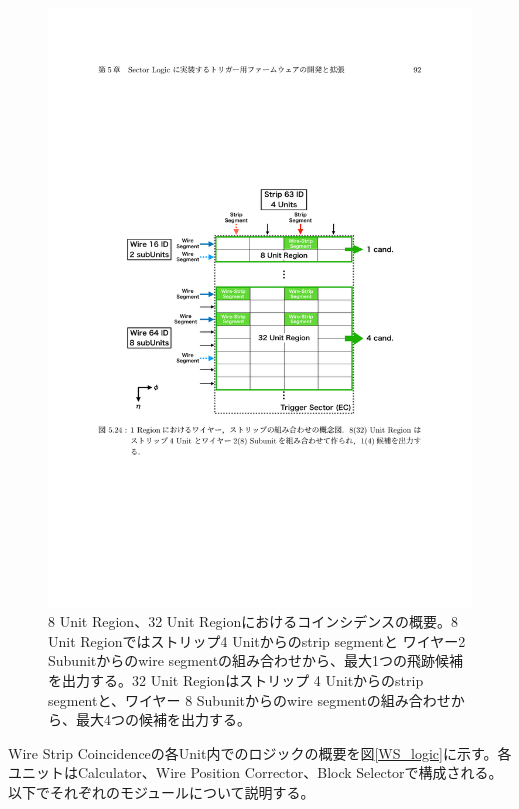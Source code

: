 \begin{figure} 
\centering
\includegraphics[width=16cm]{fig/SL/WS_Concept.pdf}
\caption[]{8 Unit Region、32 Unit Regionにおけるコインシデンスの概要\cite{mt_kawamoto}。8 Unit Regionではストリップ4 Unitからのstrip segmentと ワイヤー2 Subunitからのwire segmentの組み合わせから、最大1つの飛跡候補を出力する。32 Unit Regionはストリップ 4 Unitからのstrip segmentと、ワイヤー 8 Subunitからのwire segmentの組み合わせから、最大4つの候補を出力する。}
\label{WS_Concept}
\end{figure}

Wire Strip Coincidenceの各Unit内でのロジックの概要を図\ref{WS_logic}に示す。各ユニットは\pt  Calculator、Wire Position Corrector、Block Selectorで構成される。以下でそれぞれのモジュールについて説明する。

